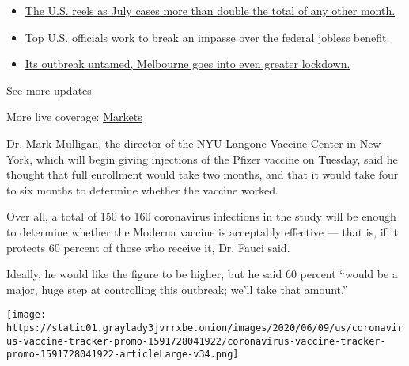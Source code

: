 \begin{itemize}
\tightlist
\item
  \href{https://www.nytimes3xbfgragh.onion/2020/08/01/world/coronavirus-covid-19.html?action=click\&pgtype=Article\&state=default\&region=MAIN_CONTENT_1\&context=storylines_live_updates\#link-34047410}{The
  U.S. reels as July cases more than double the total of any other
  month.}
\item
  \href{https://www.nytimes3xbfgragh.onion/2020/08/01/world/coronavirus-covid-19.html?action=click\&pgtype=Article\&state=default\&region=MAIN_CONTENT_1\&context=storylines_live_updates\#link-780ec966}{Top
  U.S. officials work to break an impasse over the federal jobless
  benefit.}
\item
  \href{https://www.nytimes3xbfgragh.onion/2020/08/01/world/coronavirus-covid-19.html?action=click\&pgtype=Article\&state=default\&region=MAIN_CONTENT_1\&context=storylines_live_updates\#link-2bc8948}{Its
  outbreak untamed, Melbourne goes into even greater lockdown.}
\end{itemize}

\href{https://www.nytimes3xbfgragh.onion/2020/08/01/world/coronavirus-covid-19.html?action=click\&pgtype=Article\&state=default\&region=MAIN_CONTENT_1\&context=storylines_live_updates}{See
more updates}

More live coverage:
\href{https://www.nytimes3xbfgragh.onion/live/2020/07/31/business/stock-market-today-coronavirus?action=click\&pgtype=Article\&state=default\&region=MAIN_CONTENT_1\&context=storylines_live_updates}{Markets}

Dr. Mark Mulligan, the director of the NYU Langone Vaccine Center in New
York, which will begin giving injections of the Pfizer vaccine on
Tuesday, said he thought that full enrollment would take two months, and
that it would take four to six months to determine whether the vaccine
worked.

Over all, a total of 150 to 160 coronavirus infections in the study will
be enough to determine whether the Moderna vaccine is acceptably
effective --- that is, if it protects 60 percent of those who receive
it, Dr. Fauci said.

Ideally, he would like the figure to be higher, but he said 60 percent
``would be a major, huge step at controlling this outbreak; we'll take
that amount.''

\href{https://www.nytimes3xbfgragh.onion/interactive/2020/science/coronavirus-vaccine-tracker.html}{}

\texttt{[image: https://static01.graylady3jvrrxbe.onion/images/2020/06/09/us/coronavirus-vaccine-tracker-promo-1591728041922/coronavirus-vaccine-tracker-promo-1591728041922-articleLarge-v34.png]}


